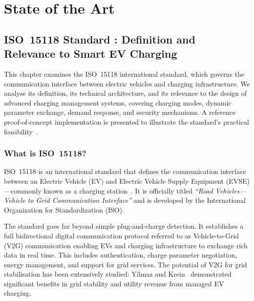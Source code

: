 \documentclass[12pt,a4paper]{report}
\begin{document}
\clearpage


\part*{State of the Art}


\chapter{ISO~15118 Standard : Definition and Relevance to Smart EV Charging}

This chapter examines the ISO~15118 international standard, which governs the communication
interface between electric vehicles and charging infrastructure. We analyse its definition,
its technical architecture, and its relevance to the design of advanced charging management
systems, covering charging modes, dynamic parameter exchange, demand response, and security
mechanisms. A reference proof-of-concept implementation is presented to illustrate the
standard's practical feasibility~\autocite{santos2024}.

\section{What is ISO~15118?}

ISO~15118 is an international standard that defines the communication interface between an
Electric Vehicle (EV) and Electric Vehicle Supply Equipment (EVSE)---commonly known as a
charging station~\autocite{iso15118_2022}. It is officially titled \textit{``Road Vehicles---Vehicle
to Grid Communication Interface''} and is developed by the International Organization for
Standardization (ISO).

The standard goes far beyond simple plug-and-charge detection. It establishes a full bidirectional
digital communication protocol referred to as Vehicle-to-Grid (V2G) communication enabling EVs
and charging infrastructure to exchange rich data in real time. This includes authentication,
charge parameter negotiation, energy management, and support for grid services. The potential of
V2G for grid stabilisation has been extensively studied: Yilmaz and Krein~\autocite{yilmaz2013}
demonstrated significant benefits in grid stability and utility revenue from managed EV charging.
\end{document}
